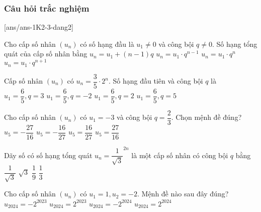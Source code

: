\subsubsection{Câu hỏi trắc nghiệm}
[ans/ans-1K2-3-dang2]
\begin{ex}%
	Cho cấp số nhân $(u_n)$ có số hạng đầu là $u_1\ne 0$ và công bội $q\ne 0$. Số hạng tổng quát của cấp số nhân bằng
	\choice
	{$ u_{n}=u_1+(n-1)q $}
	{\True $ u_{n}=u_1\cdot q^{n-1} $}
	{$ u_{n}=u_1\cdot q^n $}
	{$ u_{n}=u_1\cdot q^{n+1} $}
\end{ex}
\begin{ex}%
	Cấp số nhân  $\left(u_{n}\right)$ có $u_{n}=\dfrac{3}{5}\cdot 2^{n}$. Số hạng đầu tiên và công bội $ q $ là
	\choice
	{$u_1=\dfrac{6}{5},q=3$}
	{$u_1=\dfrac{6}{5},q=-2$}
	{\True $u_1=\dfrac{6}{5},q=2$}
	{$u_1=\dfrac{6}{5},q=5$}
\end{ex}
\begin{ex}%
	Cho cấp số nhân $(u_n)$ có $u_1=-3$ và công bội $q=\dfrac{2}{3}$. Chọn mệnh đề đúng?
	\choice
	{$u_5=-\dfrac{27}{16}$}
	{$u_5=-\dfrac{16}{27}$}
	{\True $u_5=\dfrac{16}{27}$}
	{$u_5=\dfrac{27}{16}$}
\end{ex}
\begin{ex}%
	Dãy số có số hạng tổng quát $u_{n}=\dfrac{1}{\sqrt{3}}^{2n}$ là một cấp số nhân có công bội $ q $ bằng
	\choice
	{$ \dfrac{1}{\sqrt{3}} $}
	{$ \sqrt{3} $}
	{$ \dfrac{1}{9} $}
	{\True $ \dfrac{1}{3} $}
\end{ex}
\begin{ex}%
	Cho cấp số nhân $(u_n)$ có $u_1=1, u_2=-2$. Mệnh đề nào sau đây đúng?
	\choice
	{\True $u_{2024}=-2^{2023}$}
	{$u_{2024}=2^{2023}$}
	{$u_{2024}=-2^{2024}$}
	{$u_{2024}=2^{2024}$}
\end{ex}
